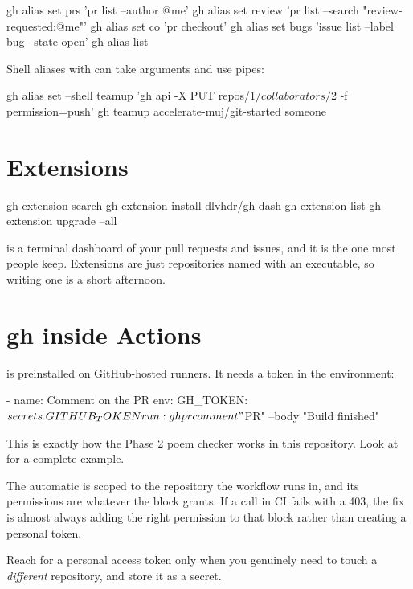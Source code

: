 \documentclass[11pt]{article}
\begin{document}
\begin{shell}
gh alias set prs 'pr list --author @me'
gh alias set review 'pr list --search "review-requested:@me"'
gh alias set co 'pr checkout'
gh alias set bugs 'issue list --label bug --state open'
gh alias list
\end{shell}

Shell aliases with  can take arguments and use pipes:

\begin{shell}
gh alias set --shell teamup 'gh api -X PUT repos/$1/collaborators/$2 -f permission=push'
gh teamup accelerate-muj/git-started someone
\end{shell}

\section{Extensions}

\begin{shell}
gh extension search
gh extension install dlvhdr/gh-dash
gh extension list
gh extension upgrade --all
\end{shell}

 is a terminal dashboard of your pull requests and issues, and it is the
one most people keep. Extensions are just repositories named  with
an executable, so writing one is a short afternoon.

\section{gh inside Actions}

 is preinstalled on GitHub-hosted runners. It needs a token in the
environment:

\begin{terminal}
- name: Comment on the PR
  env:
    GH_TOKEN: ${{ secrets.GITHUB_TOKEN }}
  run: gh pr comment "$PR" --body "Build finished"
\end{terminal}

This is exactly how the Phase 2 poem checker works in this repository. Look at
 for a complete example.

\begin{trap}
The automatic  is scoped to the repository the workflow runs in,
and its permissions are whatever the  block grants. If a 
call in CI fails with a 403, the fix is almost always adding the right permission to
that block rather than creating a personal token.

Reach for a personal access token only when you genuinely need to touch a
\emph{different} repository, and store it as a secret.
\end{trap}
\end{document}
